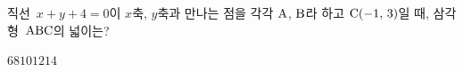 직선~$x+y+4=0$이 $x$축, $y$축과 만나는 점을 각각 $\mathrm{A}$, $\mathrm{B}$라 하고 $\mathrm{C}(-1,\mkern3mu 3)$일 때, 삼각형~$\mathrm{ABC}$의 넓이는?
\begin{choices32}{$6$}{$8$}{$10$}{$12$}{$14$}\end{choices32}

